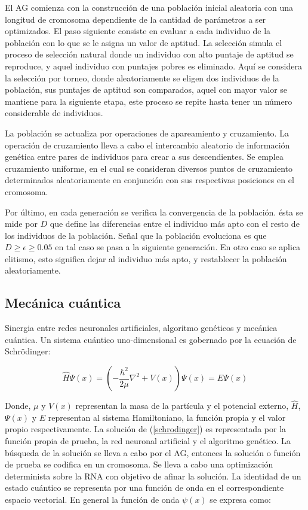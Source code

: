 El AG comienza con la construcci\'on de una poblaci\'on inicial aleatoria con una longitud de cromosoma dependiente de la cantidad de par\'ametros a ser optimizados. El paso siguiente consiste en evaluar a cada individuo de la poblaci\'on con lo que se le asigna un valor de aptitud. La selecci\'on simula el proceso de selecci\'on natural donde un individuo con alto puntaje de aptitud se reproduce, y aquel individuo con puntajes pobres es eliminado. Aqu\'i se considera la selecci\'on por torneo, donde aleatoriamente se eligen dos individuos de la poblaci\'on, sus puntajes de aptitud son comparados, aquel con mayor valor se mantiene para la siguiente etapa, este proceso se repite hasta tener un n\'umero considerable de individuos.

La poblaci\'on se actualiza por operaciones de apareamiento y cruzamiento. La operaci\'on de cruzamiento lleva a cabo el intercambio aleatorio de informaci\'on gen\'etica entre pares de individuos para crear a sus descendientes. Se emplea cruzamiento uniforme, en el cual se consideran diversos puntos de cruzamiento determinados aleatoriamente en conjunci\'on con sus respectivas posiciones en el cromosoma.

Por \'ultimo, en cada generaci\'on se verifica la convergencia de la poblaci\'on. \'esta se mide por $D$ que define las diferencias entre el individuo m\'as apto con el resto de los individuos de la poblaci\'on. Se\~nal que la poblaci\'on evoluciona es que $D\geq\epsilon\geq0.05$ en tal caso se pasa a la siguiente generaci\'on. En otro caso se aplica elitismo, esto significa dejar al individuo m\'as apto, y restablecer la poblaci\'on aleatoriamente.
\subsection{Mec\'anica cu\'antica}
Sinergia entre redes neuronales artificiales, algoritmo gen\'eticos y mec\'anica cu\'antica. Un sistema cu\'antico uno-dimensional es gobernado por la ecuaci\'on de Schr\"odinger:

\begin{equation} \widehat{H}\Psi(x)=(-\frac{\hbar^2}{2\mu}\nabla^2+V(x))\Psi(x)=E\Psi(x) \label{schrodinger}\end{equation}

Donde, $\mu$ y $V(x)$ representan la masa de la part\'icula y el potencial externo, $\widehat{H}$, $\Psi(x)$ y $E$ representan al sistema Hamiltoniano, la funci\'on propia y el valor propio respectivamente. La soluci\'on de (\ref{schrodinger}) es representada por la funci\'on propia de prueba, la red neuronal artificial y el algoritmo gen\'etico. La b\'usqueda de la soluci\'on se lleva a cabo por el AG, entonces la soluci\'on o funci\'on de prueba se codifica en un cromosoma. Se lleva a cabo una optimizaci\'on determinista sobre la RNA con objetivo de afinar la soluci\'on. La identidad de un estado cu\'antico se representa por una funci\'on de onda en el correspondiente espacio vectorial. En general la funci\'on de onda $\psi(x)$ se expresa como: 

